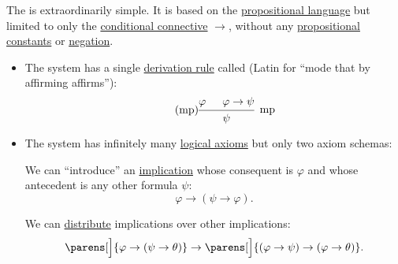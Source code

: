 \begin{definition}\label{def:positive_implicational_propositional_derivation_system}
  The  is extraordinarily simple. It is based on the \hyperref[def:propositional_language]{propositional language} but limited to only the \hyperref[def:propositional_language/connectives/conditional]{conditional connective} \( \rightarrow \), without any \hyperref[def:propositional_language/constants]{propositional constants} or \hyperref[def:propositional_language/negation]{negation}.

  \begin{itemize}
    \item The system has a single \hyperref[def:first_order_derivation_system/rules]{derivation rule} called  (Latin for \enquote{mode that by affirming affirms}):
    \begin{equation}\label{eq:def:implicational_logic/rules/modus_ponens}\tag{mp}
      \begin{prooftree}
        \hypo{\varphi}
        \hypo{\varphi \rightarrow \psi}
        \infer2[mp]{\psi}
      \end{prooftree}
    \end{equation}

    \item The system has infinitely many \hyperref[def:first_order_derivation_system/logical]{logical axioms} but only two axiom schemas:
    \begin{thmenum}
       We can \enquote{introduce} an \hyperref[def:material_implication]{implication} whose consequent is \( \varphi \) and whose antecedent is any other formula \( \psi \):
      \begin{equation}\label{eq:def:positive_implicational_propositional_derivation_system/axioms/imp_intro}
        \varphi \rightarrow (\psi \rightarrow \varphi).
      \end{equation}

       We can \hyperref[def:semiring/distributivity]{distribute} implications over other implications:
      \begin{equation}\label{eq:def:positive_implicational_propositional_derivation_system/axioms/imp_distr}
        \parens[\Big]{ \varphi \rightarrow (\psi \rightarrow \theta) } \rightarrow \parens[\Big]{ (\varphi \rightarrow \psi) \rightarrow (\varphi \rightarrow \theta)}.
      \end{equation}
    \end{thmenum}
  \end{itemize}


\end{definition}
